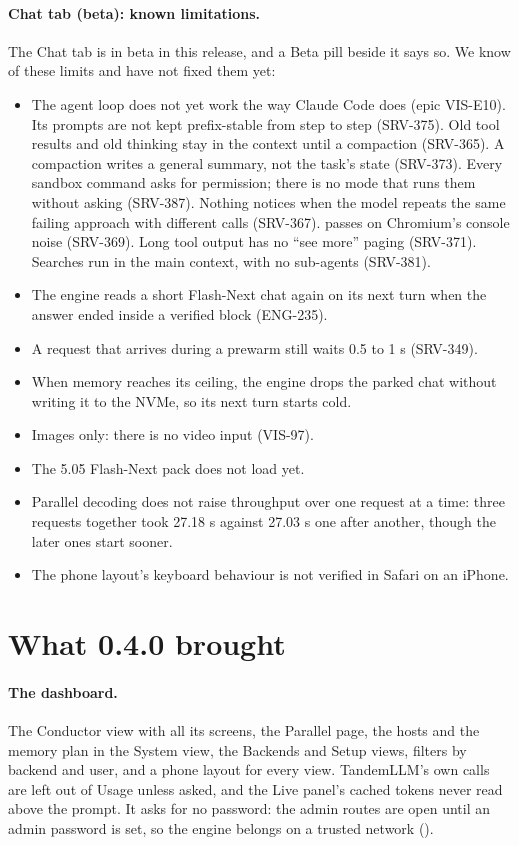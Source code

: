 \paragraph{Chat tab (beta): known limitations.} The Chat tab is in beta in this release, and a Beta pill beside it says so. We know of these limits and have not fixed them yet:
\begin{itemize}
  \item The agent loop does not yet work the way Claude Code does (epic VIS-E10). Its prompts are not kept prefix-stable from step to step (SRV-375). Old tool results and old thinking stay in the context until a compaction (SRV-365). A compaction writes a general summary, not the task's state (SRV-373). Every sandbox command asks for permission; there is no mode that runs them without asking (SRV-387). Nothing notices when the model repeats the same failing approach with different calls (SRV-367).  passes on Chromium's console noise (SRV-369). Long tool output has no ``see more'' paging (SRV-371). Searches run in the main context, with no sub-agents (SRV-381).
  \item The engine reads a short Flash-Next chat again on its next turn when the answer ended inside a verified block (ENG-235).
  \item A request that arrives during a prewarm still waits 0.5 to 1 s (SRV-349).
  \item When memory reaches its ceiling, the engine drops the parked chat without writing it to the NVMe, so its next turn starts cold.
  \item Images only: there is no video input (VIS-97).
  \item The 5.05 Flash-Next pack does not load yet.
  \item Parallel decoding does not raise throughput over one request at a time: three requests together took 27.18 s against 27.03 s one after another, though the later ones start sooner.
  \item The phone layout's keyboard behaviour is not verified in Safari on an iPhone.
\end{itemize}

\section*{What 0.4.0 brought}

\paragraph{The dashboard.} The Conductor view with all its screens, the Parallel page, the hosts and the memory plan in the System view, the Backends and Setup views, filters by backend and user, and a phone layout for every view. TandemLLM's own calls are left out of Usage unless asked, and the Live panel's cached tokens never read above the prompt. It asks for no password: the admin routes are open until an admin password is set, so the engine belongs on a trusted network ().

